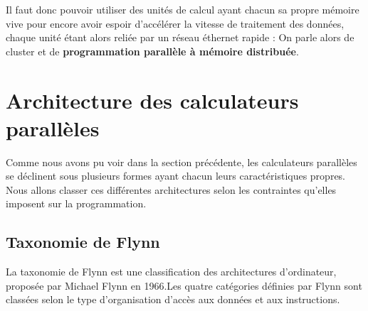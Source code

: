 \documentclass[fleqn,11pt]{article}
\begin{document}
Il faut donc pouvoir utiliser des unités de calcul ayant chacun sa propre mémoire vive pour encore avoir espoir d'accélérer la vitesse de traitement des données, chaque unité étant alors reliée par un réseau éthernet rapide : On parle alors de cluster et de \textbf{programmation parallèle à mémoire distribuée}.

\section{Architecture des calculateurs parallèles}

Comme nous avons pu voir dans la section précédente, les calculateurs parallèles se déclinent sous plusieurs formes ayant chacun leurs caractéristiques propres. Nous allons classer ces différentes architectures selon les contraintes qu'elles imposent sur la programmation. 

\subsection{Taxonomie de Flynn}

La taxonomie de Flynn est une classification des architectures d'ordinateur, proposée par Michael Flynn en 1966.Les quatre catégories définies par Flynn sont classées selon le type d'organisation d'accès aux données et aux instructions.
\end{document}
